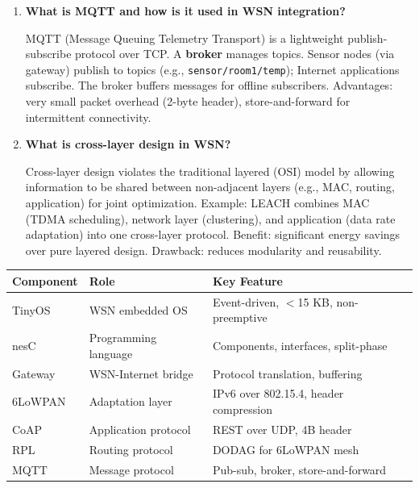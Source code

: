 \documentclass[12pt,a4paper]{article}
\newcommand{\Q}[1]{\textbf{#1}\par\noindent\ignorespaces}
\renewcommand{\arraystretch}{1.45}
\begin{document}
\begin{tcolorbox}[exambox, title={\textbf{Frequently Asked / Viva Questions}}]
\begin{enumerate}[topsep=0pt, label=\textbf{Q\arabic*.}, itemsep=5pt]
  \item \Q{What is MQTT and how is it used in WSN integration?}
  MQTT (Message Queuing Telemetry Transport) is a lightweight publish-subscribe protocol over TCP. A \textbf{broker} manages topics. Sensor nodes (via gateway) publish to topics (e.g., \texttt{sensor/room1/temp}); Internet applications subscribe. The broker buffers messages for offline subscribers. Advantages: very small packet overhead (2-byte header), store-and-forward for intermittent connectivity.

  \item \Q{What is cross-layer design in WSN?}
  Cross-layer design violates the traditional layered (OSI) model by allowing information to be shared between non-adjacent layers (e.g., MAC, routing, application) for joint optimization. Example: LEACH combines MAC (TDMA scheduling), network layer (clustering), and application (data rate adaptation) into one cross-layer protocol. Benefit: significant energy savings over pure layered design. Drawback: reduces modularity and reusability.
\end{enumerate}
\end{tcolorbox}

\begin{tcolorbox}[tikzbox, title={\textbf{Summary: WSN OS and Internet Integration}}]
\par\noindent
{\renewcommand{\arraystretch}{1.4}%
\begin{tabularx}{\linewidth}{|B{2.6cm}|Y|Y|}
\hline
\textbf{Component} & \textbf{Role} & \textbf{Key Feature} \\
\hline
TinyOS & WSN embedded OS & Event-driven, $<$15 KB, non-preemptive \\
\hline
nesC & Programming language & Components, interfaces, split-phase \\
\hline
Gateway & WSN-Internet bridge & Protocol translation, buffering \\
\hline
6LoWPAN & Adaptation layer & IPv6 over 802.15.4, header compression \\
\hline
CoAP & Application protocol & REST over UDP, 4B header \\
\hline
RPL & Routing protocol & DODAG for 6LoWPAN mesh \\
\hline
MQTT & Message protocol & Pub-sub, broker, store-and-forward \\
\hline
\end{tabularx}}
\end{tcolorbox}
\end{document}
